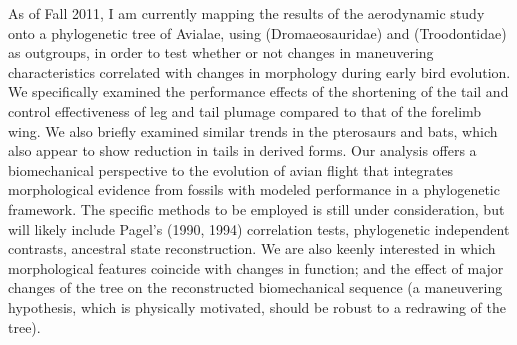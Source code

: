 As of Fall 2011, I am currently mapping the results of the aerodynamic study onto a phylogenetic tree of Avialae, using \Microraptor (Dromaeosauridae) and \Anchiornis (Troodontidae) as outgroups, in order to test whether or not changes in maneuvering characteristics correlated with changes in morphology during early bird evolution. We specifically examined the performance effects of the shortening of the tail and control effectiveness of leg and tail plumage compared to that of the forelimb wing.  We also briefly examined similar trends in the pterosaurs and bats, which also appear to show reduction in tails in derived forms. Our analysis offers a biomechanical perspective to the evolution of avian flight that integrates morphological evidence from fossils with modeled performance in a phylogenetic framework.  The specific methods to be employed is still under consideration, but will likely include Pagel's (1990, 1994) correlation tests, phylogenetic independent contrasts, ancestral state reconstruction.  We are also keenly interested in which morphological features coincide with changes in function; and the effect of major changes of the tree on the reconstructed biomechanical sequence (a maneuvering hypothesis, which is physically motivated, should be robust to a redrawing of the tree). 



